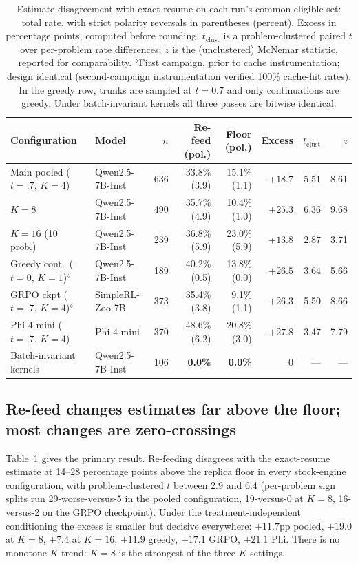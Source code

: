 \documentclass[11pt]{article}
\begin{document}
\begin{table}[t]
\centering
\small
\setlength{\tabcolsep}{4.5pt}
\begin{tabular}{llrrrrrr}
\toprule
Configuration & Model & $n$ & Re-feed (pol.) & Floor (pol.) & Excess & $t_{\text{clust}}$ & $z$ \\
\midrule
Main pooled ($t{=}.7$, $K{=}4$) & Qwen2.5-7B-Inst & 636 & 33.8\% (3.9) & 15.1\% (1.1) & $+18.7$ & 5.51 & 8.61 \\
$K{=}8$                & Qwen2.5-7B-Inst & 490 & 35.7\% (4.9) & 10.4\% (1.0) & $+25.3$ & 6.36 & 9.68 \\
$K{=}16$ (10 prob.)    & Qwen2.5-7B-Inst & 239 & 36.8\% (5.9) & 23.0\% (5.9) & $+13.8$ & 2.87 & 3.71 \\
Greedy cont.\ ($t{=}0$, $K{=}1$)$^{\diamond}$ & Qwen2.5-7B-Inst & 189 & 40.2\% (0.5) & 13.8\% (0.0) & $+26.5$ & 3.64 & 5.66 \\
GRPO ckpt ($t{=}.7$, $K{=}4$)$^{\diamond}$ & SimpleRL-Zoo-7B & 373 & 35.4\% (3.8) & 9.1\% (1.1) & $+26.3$ & 5.50 & 8.66 \\
Phi-4-mini ($t{=}.7$, $K{=}4$)  & Phi-4-mini      & 370 & 48.6\% (6.2) & 20.8\% (3.0) & $+27.8$ & 3.47 & 7.79 \\
\midrule
Batch-invariant kernels & Qwen2.5-7B-Inst & 106 & \textbf{0.0\%} & \textbf{0.0\%} & 0 & --- & --- \\
\bottomrule
\end{tabular}
\caption{Estimate disagreement with exact resume on each run's common
eligible set: total rate, with strict polarity reversals in parentheses
(percent). Excess in percentage points, computed before rounding.
$t_{\text{clust}}$ is a
problem-clustered paired $t$ over per-problem rate differences; $z$ is the
(unclustered) McNemar statistic, reported for comparability.
$^{\diamond}$First campaign, prior to cache instrumentation; design
identical (second-campaign instrumentation verified 100\% cache-hit rates).
In the greedy row, trunks are sampled at $t{=}0.7$ and only continuations are
greedy.
Under batch-invariant kernels all three passes are bitwise identical.}
\label{tab:main}
\end{table}

\subsection{Re-feed changes estimates far above the floor; most changes are
zero-crossings}

Table~\ref{tab:main} gives the primary result. Re-feeding disagrees with the
exact-resume estimate at 14--28 percentage points above the replica floor in
every stock-engine configuration, with problem-clustered $t$ between 2.9 and
6.4 (per-problem sign splits run 29-worse-versus-5 in the pooled
configuration, 19-versus-0 at $K{=}8$, 16-versus-2 on the GRPO checkpoint).
Under the treatment-independent conditioning the excess is smaller but
decisive everywhere: $+11.7$pp pooled, $+19.0$ at $K{=}8$, $+7.4$ at
$K{=}16$, $+11.9$ greedy, $+17.1$ GRPO, $+21.1$ Phi. There is no monotone
$K$ trend: $K{=}8$ is the strongest of the three $K$ settings.
\end{document}
